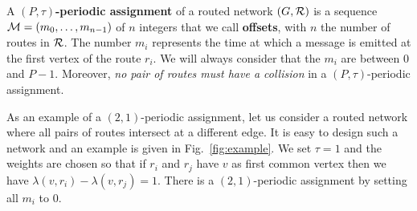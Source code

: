 \documentclass[a4paper,10pt]{article}
\begin{document}
{      A {\bf $(P,\tau)$-periodic assignment} of a routed network $(G,\cal R)$ is a sequence  ${\cal M}=(m_0, \ldots ,m_{n-1})$ of $n$ integers that we call {\bf offsets}, with $n$ the number of routes in $\cal R$. The number $m_{i}$ represents the time at which a message is emitted at the first vertex of the route $r_{i}$. We will always consider that the $m_{i}$ are between $0$ and $P-1$. Moreover, \emph{no pair of routes must have a collision} in a $(P,\tau)$-periodic assignment.

      As an example of a $(2,1)$-periodic assignment, let us consider a routed network 
      where all pairs of routes intersect at a different edge. It is easy to design such a network and an example is given in Fig.~\ref{fig:example}. We set $\tau = 1$ and the weights are chosen so that if $r_{i}$ and $r_{j}$ have $v$ as first common vertex then we have $\lambda(v,r_{i}) - \lambda(v,r_{j})=1$. There is a $(2,1)$-periodic assignment by setting all $m_{i}$ to $0$.

  
      \begin{figure}[ht]
      \begin{center}
\end{center}
\end{figure}}
\end{document}
